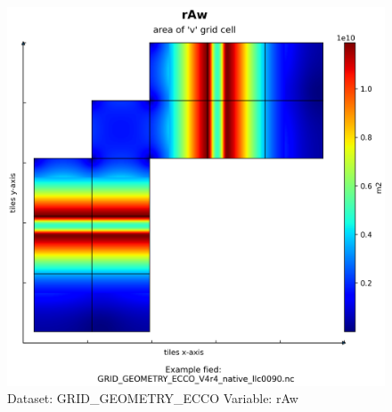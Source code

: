 \begin{figure}[H]
\centering
\includegraphics[scale=0.55]{../images/plots/native_plots_coords/Geometry_Parameters_for_the_Lat-Lon-Cap_90_(llc90)_Native_Model_Grid_(Version_4_Release_4)/rAw.png}
\caption{Dataset: GRID\_GEOMETRY\_ECCO Variable: rAw}
\label{tab:table-GRID_GEOMETRY_ECCO_rAw-Plot}
\end{figure}
\pagebreak
